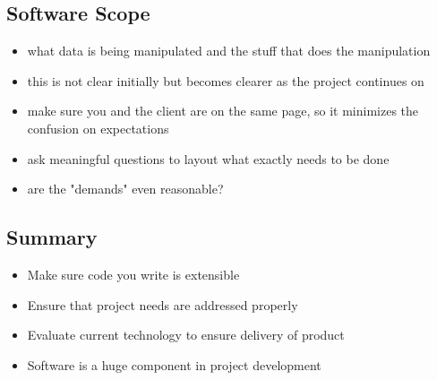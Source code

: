 \documentclass{article}
\begin{document}
\subsection{Software Scope}

\begin{itemize}
\item what data is being manipulated and the stuff that does the manipulation
\item this is not clear initially but becomes clearer as the project continues on
\item make sure you and the client are on the same page, so it minimizes the confusion on expectations
\item ask meaningful questions to layout what exactly needs to be done
\item are the "demands" even reasonable?
\end{itemize}

\subsection{Summary}

\begin{itemize}
\item Make sure code you write is extensible
\item Ensure that project needs are addressed properly
\item Evaluate current technology to ensure delivery of product
\item Software is a huge component in project development
\end{itemize}
\end{document}
